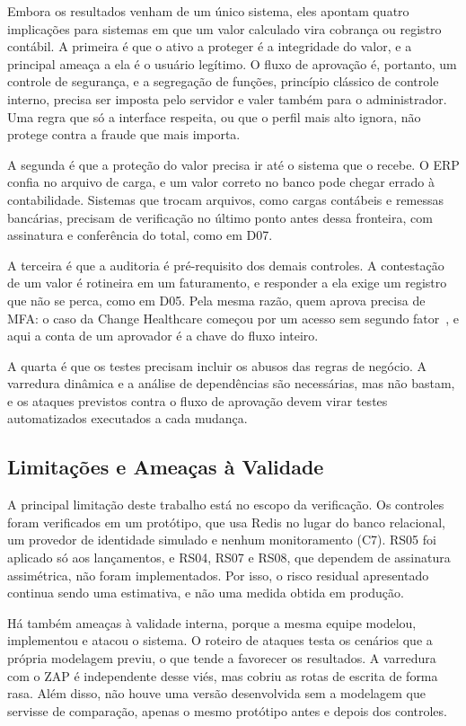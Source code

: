 \documentclass[conference]{IEEEtran}
\begin{document}
Embora os resultados venham de um único sistema, eles apontam quatro implicações para sistemas em que um valor calculado vira cobrança ou registro contábil. A primeira é que o ativo a proteger é a integridade do valor, e a principal ameaça a ela é o usuário legítimo. O fluxo de aprovação é, portanto, um controle de segurança, e a segregação de funções, princípio clássico de controle interno, precisa ser imposta pelo servidor e valer também para o administrador. Uma regra que só a interface respeita, ou que o perfil mais alto ignora, não protege contra a fraude que mais importa.

A segunda é que a proteção do valor precisa ir até o sistema que o recebe. O ERP confia no arquivo de carga, e um valor correto no banco pode chegar errado à contabilidade. Sistemas que trocam arquivos, como cargas contábeis e remessas bancárias, precisam de verificação no último ponto antes dessa fronteira, com assinatura e conferência do total, como em D07. 

A terceira é que a auditoria é pré-requisito dos demais controles. A contestação de um valor é rotineira em um faturamento, e responder a ela exige um registro que não se perca, como em D05. Pela mesma razão, quem aprova precisa de MFA: o caso da Change Healthcare começou por um acesso sem segundo fator~\cite{witty2024}, e aqui a conta de um aprovador é a chave do fluxo inteiro. 

A quarta é que os testes precisam incluir os abusos das regras de negócio. A varredura dinâmica e a análise de dependências são necessárias, mas não bastam, e os ataques previstos contra o fluxo de aprovação devem virar testes automatizados executados a cada mudança.

\subsection{Limitações e Ameaças à Validade}
\label{subsec:limitacoes}

A principal limitação deste trabalho está no escopo da verificação. Os controles foram verificados em um protótipo, que usa Redis no lugar do banco relacional, um provedor de identidade simulado e nenhum monitoramento (C7). RS05 foi aplicado só aos lançamentos, e RS04, RS07 e RS08, que dependem de assinatura assimétrica, não foram implementados. Por isso, o risco residual apresentado continua sendo uma estimativa, e não uma medida obtida em produção.

Há também ameaças à validade interna, porque a mesma equipe modelou, implementou e atacou o sistema. O roteiro de ataques testa os cenários que a própria modelagem previu, o que tende a favorecer os resultados. A varredura com o ZAP é independente desse viés, mas cobriu as rotas de escrita de forma rasa. Além disso, não houve uma versão desenvolvida sem a modelagem que servisse de comparação, apenas o mesmo protótipo antes e depois dos controles.
\end{document}
